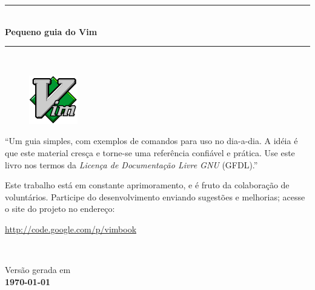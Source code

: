 \documentclass[10pt,a4paper,openany]{book}
\newcommand{\titulo}{\Huge \sc Pequeno guia do Vim}
\begin{document}
{}

\begin{titlepage}
 \begin{flushleft}
   \vspace{2mm}
   \vspace{2mm}
   \vspace{2mm}
 \end{flushleft}
\begin{center}
   \rule{12cm}{1mm} \\ \vspace{2mm}
   {\LARGE{\bf{\titulo}}} \\
   \vspace{-1mm}
   \rule{12cm}{1mm} \\

  \vspace{2cm}
  \begin{figure}[h]
    \center
    \includegraphics{img/vimlogo.png}
    \label{logodovim}
\end{figure}

   \vspace{3cm}
   \begin{flushright}
   \begin{minipage}[t]{8cm}
          ``Um guia simples, com exemplos de comandos
          para uso no dia-a-dia. A idéia é que este
          material cresça e torne-se uma referência confiável
          e prática. Use este livro nos termos da {\em Licença de Documentação Livre GNU} (GFDL).'' \\
          \par Este trabalho está em constante aprimoramento, e é fruto da
          colaboração de voluntários. Participe do desenvolvimento enviando sugestões e
          melhorias; acesse o site do projeto no endereço: \\
\begin{center}
          \url{http://code.google.com/p/vimbook}
\end{center}
        
   \end{minipage} \\
   \end{flushright}

   \vspace{3cm}

   {\small Versão gerada em \\ \bf \today}
\end{center}
\end{titlepage}
\end{document}
